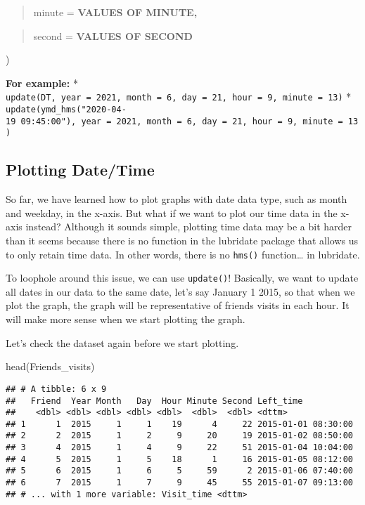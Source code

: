 \documentclass[
]{book}
\newenvironment{Shaded}{\begin{snugshade}}{\end{snugshade}}
\newcommand{\FunctionTok}[1]{\textcolor[rgb]{0.00,0.00,0.00}{#1}}
\newcommand{\NormalTok}[1]{#1}
\begin{document}
\begin{quote}
minute = \textbf{VALUES OF MINUTE,}
\end{quote}

\begin{quote}
second = \textbf{VALUES OF SECOND}
\end{quote}

)

\textbf{For example:}
* \texttt{update(DT,\ year\ =\ 2021,\ month\ =\ 6,\ day\ =\ 21,\ hour\ =\ 9,\ minute\ =\ 13)}
* \texttt{update(ymd\_hms("2020-04-19\ 09:45:00"),\ year\ =\ 2021,\ month\ =\ 6,\ day\ =\ 21,\ hour\ =\ 9,\ minute\ =\ 13)}

\hypertarget{plotting-datetime}{%
\subsection{Plotting Date/Time}\label{plotting-datetime}}

So far, we have learned how to plot graphs with date data type, such as month and weekday, in the x-axis. But what if we want to plot our time data in the x-axis instead? Although it sounds simple, plotting time data may be a bit harder than it seems because there is no function in the lubridate package that allows us to only retain time data. In other words, there is no \texttt{hms()} function\ldots{} in lubridate.

To loophole around this issue, we can use \texttt{update()}! Basically, we want to update all dates in our data to the same date, let's say January 1 2015, so that when we plot the graph, the graph will be representative of friends visits in each hour. It will make more sense when we start plotting the graph.

Let's check the dataset again before we start plotting.

\begin{Shaded}
\begin{Highlighting}[]
\FunctionTok{head}\NormalTok{(Friends\_visits)}
\end{Highlighting}
\end{Shaded}

\begin{verbatim}
## # A tibble: 6 x 9
##   Friend  Year Month   Day  Hour Minute Second Left_time
##    <dbl> <dbl> <dbl> <dbl> <dbl>  <dbl>  <dbl> <dttm>
## 1      1  2015     1     1    19      4     22 2015-01-01 08:30:00
## 2      2  2015     1     2     9     20     19 2015-01-02 08:50:00
## 3      4  2015     1     4     9     22     51 2015-01-04 10:04:00
## 4      5  2015     1     5    18      1     16 2015-01-05 08:12:00
## 5      6  2015     1     6     5     59      2 2015-01-06 07:40:00
## 6      7  2015     1     7     9     45     55 2015-01-07 09:13:00
## # ... with 1 more variable: Visit_time <dttm>
\end{verbatim}
\end{document}
